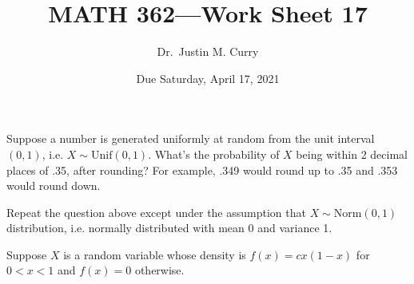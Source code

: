 \documentclass[addpoints,12pt]{exam}
\title{\vspace{-1in} MATH 362---Work Sheet 17}
\date{Due Saturday, April 17, 2021}
\author{Dr.~Justin M. Curry}
\begin{document}
\maketitle






\begin{questions}

\question[1] Suppose a number is generated uniformly at random from the unit interval $(0,1)$, i.e. $X\sim \text{Unif}(0,1)$. What's the probability of $X$ being within 2 decimal places of .35, after rounding? For example, .349 would round up to .35 and .353 would round down.

\vspace{1.2in}

\question[1] Repeat the question above except under the assumption that $X\sim \text{Norm}(0,1)$ distribution, i.e. normally distributed with mean 0 and variance 1.

\vspace{1.2in}

\question[5] Suppose $X$ is a random variable whose density is $f(x)=cx(1-x)$ for $0<x<1$ and $f(x)=0$ otherwise.

\noaddpoints
{}
\end{questions}
\end{document}
